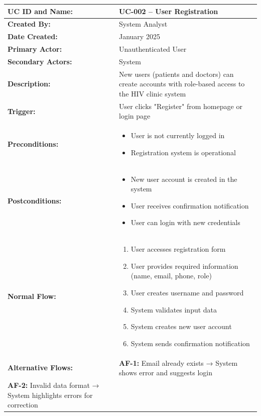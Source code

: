 \documentclass[12pt,a4paper]{article}
\begin{document}
\renewcommand{\arraystretch}{1.5}
\begin{longtable}{|p{4.5cm}|p{10.5cm}|}
\hline
\textbf{UC ID and Name:} & UC-002 – User Registration \\
\hline
\textbf{Created By:} & System Analyst \\
\hline
\textbf{Date Created:} & January 2025 \\
\hline
\textbf{Primary Actor:} & Unauthenticated User \\
\hline
\textbf{Secondary Actors:} & System \\
\hline
\textbf{Description:} & New users (patients and doctors) can create accounts with role-based access to the HIV clinic system \\
\hline
\textbf{Trigger:} & User clicks "Register" from homepage or login page \\
\hline
\textbf{Preconditions:} &
\begin{itemize}
  \item User is not currently logged in
  \item Registration system is operational
\end{itemize} \\
\hline
\textbf{Postconditions:} &
\begin{itemize}
  \item New user account is created in the system
  \item User receives confirmation notification
  \item User can login with new credentials
\end{itemize} \\
\hline
\textbf{Normal Flow:} &
\begin{enumerate}
  \item User accesses registration form
  \item User provides required information (name, email, phone, role)
  \item User creates username and password
  \item System validates input data
  \item System creates new user account
  \item System sends confirmation notification
\end{enumerate} \\
\hline
\textbf{Alternative Flows:} &
\textbf{AF-1:} Email already exists → System shows error and suggests login \\
\textbf{AF-2:} Invalid data format → System highlights errors for correction \\

\end{longtable}
\end{document}
